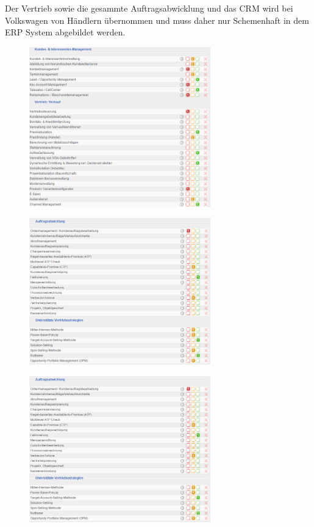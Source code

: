 \documentclass[12pt]{article}
\begin{document}
\noindent
Der Vertrieb sowie die gesammte Auftragsabwicklung und das CRM wird bei Volkswagen von Händlern übernommen und muss daher nur Schemenhaft in dem ERP System abgebildet werden.
\begin{figure}[here!]
\centering
\includegraphics[width=0.7\textwidth]{images/tr11}
\end{figure}\FloatBarrier
\noindent
\begin{figure}[here!]
\centering
\includegraphics[width=0.7\textwidth]{images/tr12}
\end{figure}\FloatBarrier
\noindent
\begin{figure}[here!]
\centering
\includegraphics[width=0.7\textwidth]{images/tr13}
\end{figure}\FloatBarrier
\end{document}
